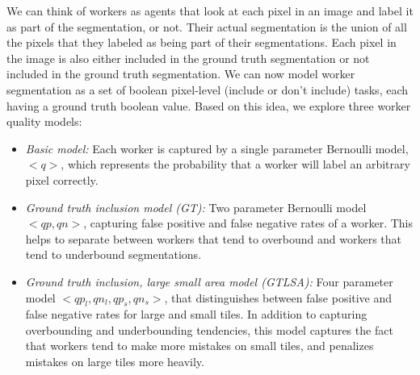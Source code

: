 We can think of workers as agents that look at each pixel in an image and label it as part of the segmentation, or not. Their actual segmentation is the union of all the pixels that they labeled as being part of their segmentations. Each pixel in the image is also either included in the ground truth segmentation or not included in the ground truth segmentation. We can now model worker segmentation as a set of boolean pixel-level (include or don't include) tasks, each having a ground truth boolean value. Based on this idea, we explore three worker quality models:
\begin{itemize}
\item {\em Basic model:} Each worker is captured by a single parameter Bernoulli model, $<q>$, which represents the probability that a worker will label an arbitrary pixel correctly.
\item {\em Ground truth inclusion model (GT):} Two parameter Bernoulli model $<qp, qn>$, capturing false positive and false negative rates of a worker. This helps to separate between workers that tend to overbound and workers that tend to underbound segmentations.
\item {\em Ground truth inclusion, large small area model (GTLSA):} Four parameter model $<qp_l, qn_l, qp_s, qn_s>$, that distinguishes between false positive and false negative rates for large and small tiles. In addition to capturing overbounding and underbounding tendencies, this model captures the fact that workers tend to make more mistakes on small tiles, and penalizes mistakes on large tiles more heavily.
\end{itemize}


